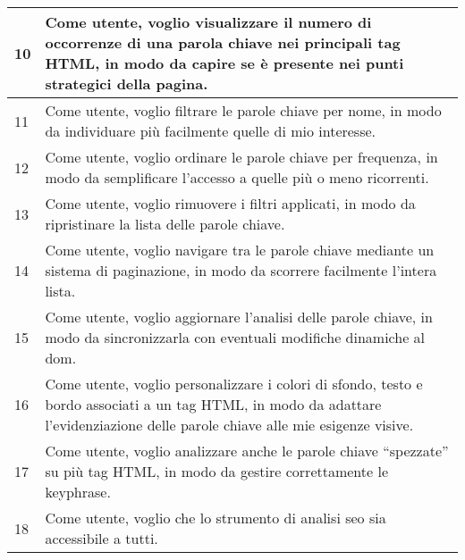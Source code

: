 \begin{tabularx}{\textwidth}{lX}
\hline
10 & Come utente, voglio visualizzare il numero di occorrenze di una parola chiave nei principali tag HTML, in modo da capire se è presente nei punti strategici della pagina. \\
\hline
11 & Come utente, voglio filtrare le parole chiave per nome, in modo da individuare più facilmente quelle di mio interesse. \\
\hline
12 & Come utente, voglio ordinare le parole chiave per frequenza, in modo da semplificare l’accesso a quelle più o meno ricorrenti. \\
\hline
13 & Come utente, voglio rimuovere i filtri applicati, in modo da ripristinare la lista delle parole chiave. \\
\hline
14 & Come utente, voglio navigare tra le parole chiave mediante un sistema di paginazione, in modo da scorrere facilmente l’intera lista. \\
\hline
15 & Come utente, voglio aggiornare l'analisi delle parole chiave, in modo da sincronizzarla con eventuali modifiche dinamiche al \gls{dom}. \\
\hline
16 & Come utente, voglio personalizzare i colori di sfondo, testo e bordo associati a un tag HTML, in modo da adattare l'evidenziazione delle parole chiave alle mie esigenze visive. \\
\hline
17 & Come utente, voglio analizzare anche le parole chiave “spezzate” su più tag HTML, in modo da gestire correttamente le keyphrase. \\
\hline
18 & Come utente, voglio che lo strumento di analisi \gls{seo} sia accessibile a tutti. \\
\end{tabularx}